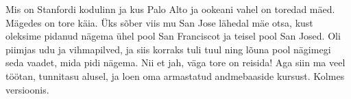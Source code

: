 
Mis on Stanfordi kodulinn ja kus Palo Alto ja ookeani vahel on toredad 
mäed. Mägedes on tore käia. Üks sõber 
viis mu San Jose lähedal mäe otsa, kust oleksime pidanud nägema ühel pool 
San Franciscot ja teisel pool San Josed. Oli piimjas udu ja vihmapilved, ja siis korraks tuli tuul 
ning lõuna pool nägimegi seda vaadet, mida pidi nägema. Nii et jah, väga tore 
on reisida! Aga siin ma veel töötan, tunnitasu alusel, ja loen oma 
armastatud andmebaaside kursust. Kolmes versioonis.